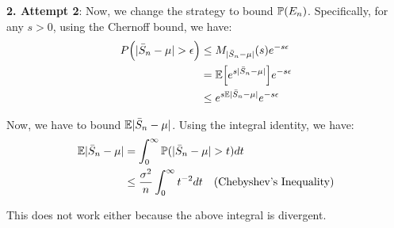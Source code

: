 \begin{proof*}
    \noindent\newline\textbf{2. Attempt 2}: Now, we change the strategy to bound $\mathbb{P}(E_n)$. Specifically, for any $s>0$, using the Chernoff bound, we have:
    \begin{align*}
        P\Big( |\bar S_n - \mu| > \epsilon \Big) &\le M_{|\bar S_n - \mu|}(s) e^{-s\epsilon} \\
            &= \mathbb{E}\Big[ e^{s|\bar S_n - \mu|} \Big]e^{-s\epsilon} \\
            &\le e^{s\mathbb{E}|\bar S_n - \mu|}e^{-s\epsilon}
    \end{align*}

    \noindent Now, we have to bound $\mathbb{E}|\bar S_n - \mu|$. Using the integral identity, we have:
    \begin{align*}
        \E|\bar S_n - \mu| &= \int_0^\infty \Pm(|\bar S_n - \mu| > t)dt \\
            &\le \frac{\sigma^2}{n}\int_0^\infty t^{-2} dt \ \ \ (\text{Chebyshev's Inequality})
    \end{align*}

    \noindent This does not work either because the above integral is divergent.
\end{proof*}
